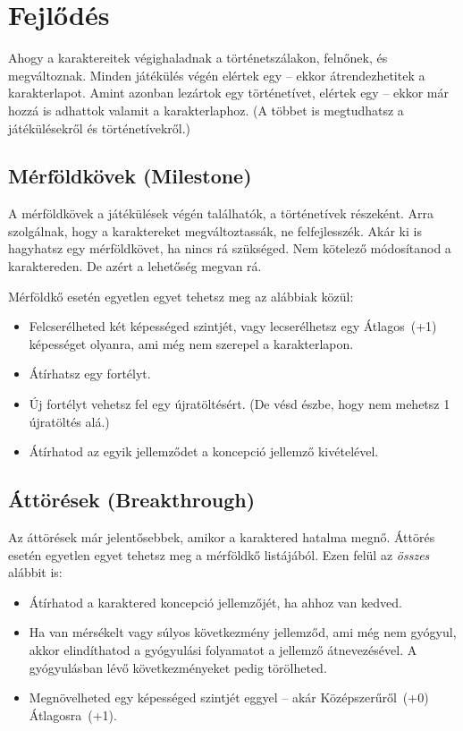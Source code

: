 \label{Fejlődés}
\chapter{Fejlődés}

Ahogy a karaktereitek végighaladnak a történetszálakon, felnőnek, és megváltoznak. Minden játékülés végén elértek egy  -- ekkor átrendezhetitek a karakterlapot. Amint azonban lezártok egy történetívet, elértek egy  -- ekkor már hozzá is adhattok valamit a karakterlaphoz. (A  többet is megtudhatsz a játékülésekről és történetívekről.)

\section[Mérföldkövek]{Mérföldkövek (Milestone)}

A mérföldkövek a játékülések végén találhatók, a történetívek részeként. Arra szolgálnak, hogy a karaktereket megváltoztassák, ne felfejlesszék. Akár ki is hagyhatsz egy mérföldkövet, ha nincs rá szükséged. Nem kötelező módosítanod a karaktereden. De azért a lehetőség megvan rá.

Mérföldkő esetén egyetlen egyet tehetsz meg az alábbiak közül:

\begin{itemize}
    \item Felcserélheted két képességed szintjét, vagy lecserélhetsz egy Átlagos~(+1) képességet olyanra, ami még nem szerepel a karakterlapon.
    \item Átírhatsz egy fortélyt.
    \item Új fortélyt vehetsz fel egy újratöltésért. (De vésd észbe, hogy nem mehetsz 1 újratöltés alá.)
    \item Átírhatod az egyik jellemződet a koncepció jellemző kivételével.
\end{itemize}

\section[Áttörések]{Áttörések (Breakthrough)}

Az áttörések már jelentősebbek, amikor a karaktered hatalma megnő. Áttörés esetén egyetlen egyet tehetsz meg a mérföldkő listájából. Ezen felül az \emph{összes} alábbit is:

\begin{itemize}
    \item Átírhatod a karaktered koncepció jellemzőjét, ha ahhoz van kedved.
    \item Ha van mérsékelt vagy súlyos következmény jellemződ, ami még nem gyógyul, akkor elindíthatod a gyógyulási folyamatot a jellemző átnevezésével. A gyógyulásban lévő következményeket pedig törölheted.
    \item Megnövelheted egy képességed szintjét eggyel -- akár Középszerűről~(+0) Átlagosra~(+1).
\end{itemize}

